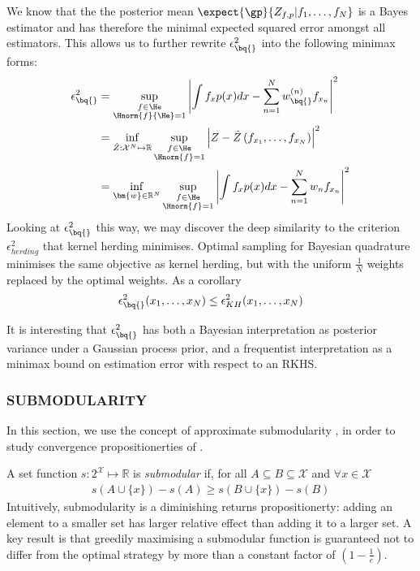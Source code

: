 We know that the the posterior mean $\expect{\gp}{Z_{f,p}\vert f_1,\ldots,f_N}$ is a Bayes estimator and has therefore the minimal expected squared error amongst all estimators. This allows us to further rewrite $\epsilon^{2}_{\bq{}}$ into the following minimax forms:
%
\begin{align}
\epsilon^{2}_{\bq{}} &= \sup_{\substack{f\in\He\\\Hnorm{f}{\He}=1}} \left| \int f_x p(x) dx - \sum_{n=1}^{N}w^{(n)}_{\bq{}} f_{x_n}\right|^2\\
	&= \inf_{\hat{Z}:\mathcal{X}^N\mapsto\mathbb{R}} \sup_{\substack{f\in\He\\\Hnorm{f}=1}} \left| Z - \hat{Z}\left(f_{x_1},\ldots,f_{x_N}\right)\right|^2\\
	&= \inf_{\bm{w}\in\mathbb{R}^N} \sup_{\substack{f\in\He\\\Hnorm{f}=1}} \left| \int f_x p(x) dx - \sum_{n=1}^{N}w_n 	f_{x_n}\right|^2
\end{align}
%
Looking at $\epsilon^{2}_{\bq{}}$  this way, we may discover the deep similarity to the criterion $\epsilon^2_{herding}$ that kernel herding minimises. Optimal sampling for Bayesian quadrature minimises the same objective as kernel herding, but with the uniform $\frac{1}{N}$ weights replaced by the optimal weights. As a corollary
%
\begin{align}
\epsilon^{2}_{\bq{}}(x_1,\ldots,x_N)  \leq \epsilon^{2}_{KH} (x_1,\ldots,x_N)
\end{align}

It is interesting that $\epsilon^{2}_{\bq{}}$ has both a Bayesian interpretation as posterior variance under a Gaussian process prior, and a frequentist interpretation as a minimax bound on estimation error with respect to an RKHS.

\subsubsection{SUBMODULARITY}

\label{sec:submodularity}

In this section, we use the concept of approximate submodularity \citep{KrauseCevher10}, in order to study convergence propositionerties of \sbq{}.

A set function $s:2^\mathcal{X} \mapsto \mathbb{R}$ is \textit{submodular} if, for all $A\subseteq B\subseteq \mathcal{X}$ and $\forall x \in \mathcal{X}$
%
\begin{align}
s(A\cup\{x\})-s(A)\geq s(B\cup\{x\})-s(B)
\end{align}
%
Intuitively, submodularity is a diminishing returns propositionerty: adding an element to a smaller set has larger relative effect than adding it to a larger set. A key result \cite[see e.\,g.\ ][and references therein]{KrauseCevher10} is that greedily maximising a submodular function is guaranteed not to differ from the optimal strategy by more than a constant factor of $(1-\frac{1}{e})$.

